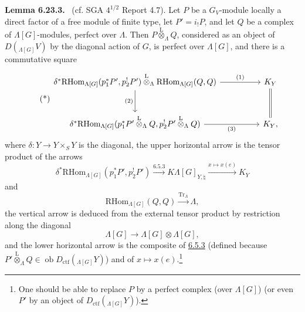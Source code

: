 \documentclass[11pt]{article}
\newenvironment{statement}[1]{\par\medskip\noindent\textbf{#1.}\ }{\par\medskip}
\newcommand{\ob}{\operatorname{ob}}
\providecommand{\RHom}{\mathrm{RHom}}
\providecommand{\Tr}{\operatorname{Tr}}
\providecommand{\Tr}{\operatorname{Tr}}
\providecommand{\lten}{\overset{\mathrm L}{\otimes}}
\providecommand{\Tr}{\operatorname{Tr}}
\providecommand{\RHom}{\mathrm{RHom}}
\providecommand{\ob}{\operatorname{ob}}
\providecommand{\lten}{\overset{\mathrm L}{\otimes}}
\providecommand{\RHom}{\mathrm R\mathcal{H}om}
\providecommand{\lten}{\overset{\mathrm L}{\otimes}}
\providecommand{\Tr}{\operatorname{Tr}}
\providecommand{\lten}{\overset{\mathrm L}{\otimes}}
\providecommand{\lten}{\overset{\mathrm L}{\otimes}}
\providecommand{\lten}{\overset{\mathrm L}{\otimes}}
\providecommand{\RHom}{\mathrm{RHom}}
\providecommand{\Tr}{\operatorname{Tr}}
\providecommand{\lten}{\overset{\mathrm L}{\otimes}}
\begin{document}
\label{sga5:IIIB:lemma:6.23.3}\begin{statement}{Lemma 6.23.3}
(cf. SGA $4^{1/2}$ Report 4.7). Let $P$ be a $G_V$-module locally a direct factor of a free module of finite type, let $P'=i_!P$, and let $Q$ be a complex of $\Lambda[G]$-modules, perfect over $\Lambda$. Then $P\lten_{\Lambda}Q$, considered as an object of $D({}_{\Lambda[G]}V)$ by the diagonal action of $G$, is perfect over $\Lambda[G]$, and there is a commutative square
\begin{equation}\tag{*}\label{sga5:IIIB:equation:unnumbered:7}
\begin{tikzcd}[column sep=huge,row sep=large]
\delta^*\RHom_{\Lambda[G]}(p_1^*P',p_2^!P')\lten_{\Lambda}
\RHom_{\Lambda[G]}(Q,Q) \arrow[r,"(1)"] \arrow[d,"(2)"']
& K_Y \arrow[d,equal]\\
\delta^*\RHom_{\Lambda[G]}(p_1^*P'\lten_{\Lambda}Q,p_2^!P'\lten_{\Lambda}Q) \arrow[r,"(3)"']
& K_Y ,
\end{tikzcd}
\end{equation}
where $\delta:Y\to Y\times_SY$ is the diagonal, the upper horizontal arrow is the tensor product of the arrows
\[
\delta^*\RHom_{\Lambda[G]}(p_1^*P',p_2^!P')\xrightarrow{\hyperref[sga5:IIIB:equation:6.5.3]{6.5.3}}
K\Lambda[G]_{Y,\natural}\xrightarrow{x\mapsto x(e)}K_Y
\]
and
\[
\RHom_{\Lambda[G]}(Q,Q)\xrightarrow{\Tr_{\Lambda}}\Lambda,
\]
the vertical arrow is deduced from the external tensor product by restriction along the diagonal
\[
\Lambda[G]\to\Lambda[G]\otimes\Lambda[G],
\]
and the lower horizontal arrow is the composite of \hyperref[sga5:IIIB:equation:6.5.3]{6.5.3} (defined because $P'\lten_{\Lambda}Q\in\ob D_{\mathrm{ctf}}({}_{\Lambda[G]}Y)$) and of $x\mapsto x(e)$.\footnote{One should be able to replace $P$ by a perfect complex (over $\Lambda[G]$) (or even $P'$ by an object of $D_{\mathrm{ctf}}({}_{\Lambda[G]}Y)$).}
\end{statement}
\end{document}

